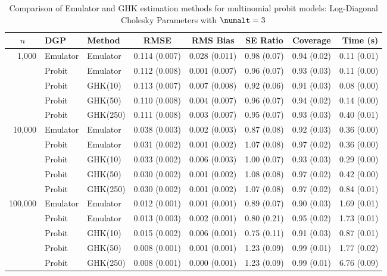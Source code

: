 \begin{table}[htbp]
\centering
\footnotesize
\begin{tabular}{@{}rllrrrrr@{}}
\toprule
\multicolumn{1}{c}{$n$} & \multicolumn{1}{l}{DGP} & \multicolumn{1}{l}{Method} & \multicolumn{1}{c}{RMSE} & \multicolumn{1}{c}{RMS Bias} & \multicolumn{1}{c}{SE Ratio} & \multicolumn{1}{c}{Coverage} & \multicolumn{1}{r}{Time (s)} \\
\midrule
\multirow{5}{*}{1,000} & Emulator & Emulator & 0.114 (0.007) & 0.028 (0.011) & 0.98 (0.07) & 0.94 (0.02) & 0.11 (0.01) \\
 & Probit & Emulator & 0.112 (0.008) & 0.001 (0.007) & 0.96 (0.07) & 0.93 (0.03) & 0.11 (0.00) \\
 & Probit & GHK(10) & 0.113 (0.007) & 0.007 (0.008) & 0.92 (0.06) & 0.91 (0.03) & 0.08 (0.00) \\
 & Probit & GHK(50) & 0.110 (0.008) & 0.004 (0.007) & 0.96 (0.07) & 0.94 (0.02) & 0.14 (0.00) \\
 & Probit & GHK(250) & 0.111 (0.008) & 0.003 (0.007) & 0.95 (0.07) & 0.93 (0.03) & 0.40 (0.01) \\
\midrule
\multirow{5}{*}{10,000} & Emulator & Emulator & 0.038 (0.003) & 0.002 (0.003) & 0.87 (0.08) & 0.92 (0.03) & 0.36 (0.00) \\
 & Probit & Emulator & 0.031 (0.002) & 0.001 (0.002) & 1.07 (0.08) & 0.97 (0.02) & 0.36 (0.00) \\
 & Probit & GHK(10) & 0.033 (0.002) & 0.006 (0.003) & 1.00 (0.07) & 0.93 (0.03) & 0.29 (0.00) \\
 & Probit & GHK(50) & 0.030 (0.002) & 0.001 (0.002) & 1.08 (0.08) & 0.97 (0.02) & 0.42 (0.00) \\
 & Probit & GHK(250) & 0.030 (0.002) & 0.001 (0.002) & 1.07 (0.08) & 0.97 (0.02) & 0.84 (0.01) \\
\midrule
\multirow{5}{*}{100,000} & Emulator & Emulator & 0.012 (0.001) & 0.001 (0.001) & 0.89 (0.07) & 0.90 (0.03) & 1.69 (0.01) \\
 & Probit & Emulator & 0.013 (0.003) & 0.002 (0.001) & 0.80 (0.21) & 0.95 (0.02) & 1.73 (0.01) \\
 & Probit & GHK(10) & 0.015 (0.002) & 0.006 (0.001) & 0.75 (0.11) & 0.91 (0.03) & 0.87 (0.01) \\
 & Probit & GHK(50) & 0.008 (0.001) & 0.001 (0.001) & 1.23 (0.09) & 0.99 (0.01) & 1.77 (0.02) \\
 & Probit & GHK(250) & 0.008 (0.001) & 0.000 (0.001) & 1.23 (0.09) & 0.99 (0.01) & 6.76 (0.09) \\
\bottomrule
\end{tabular}
\caption{Comparison of Emulator and GHK estimation methods for multinomial probit models: Log-Diagonal Cholesky Parameters with $\numalt=3$}
\label{tab:emulator_vs_ghk:3:ldiag}
\end{table}